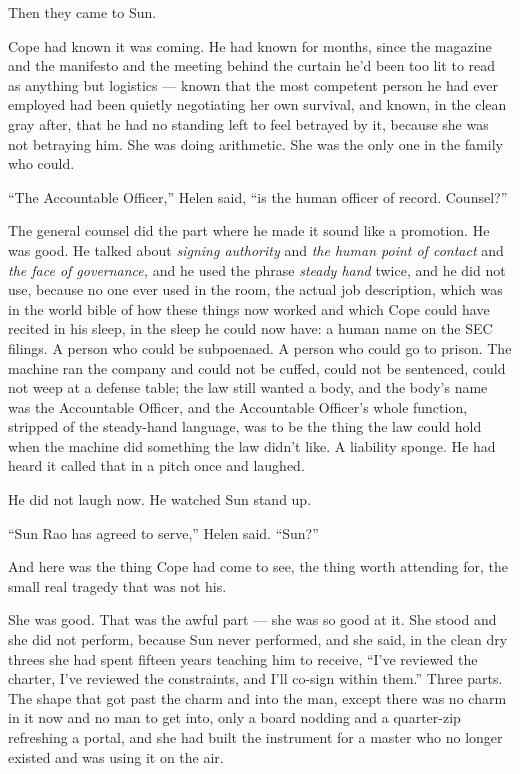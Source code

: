 \documentclass[11pt,openany]{book}
\newcommand{\scenebreak}{\par\vspace{0.5\baselineskip}\begin{center}\textasteriskcentered\quad\textasteriskcentered\quad\textasteriskcentered\end{center}\vspace{0.5\baselineskip}\par}
\begin{document}
\scenebreak


Then they came to Sun.

Cope had known it was coming. He had known for months, since the magazine and the manifesto and the meeting behind the curtain he'd been too lit to read as anything but logistics --- known that the most competent person he had ever employed had been quietly negotiating her own survival, and known, in the clean gray after, that he had no standing left to feel betrayed by it, because she was not betraying him. She was doing arithmetic. She was the only one in the family who could.

``The Accountable Officer,'' Helen said, ``is the human officer of record. Counsel?''

The general counsel did the part where he made it sound like a promotion. He was good. He talked about \textit{signing authority} and \textit{the human point of contact} and \textit{the face of governance,} and he used the phrase \textit{steady hand} twice, and he did not use, because no one ever used in the room, the actual job description, which was in the world bible of how these things now worked and which Cope could have recited in his sleep, in the sleep he could now have: a human name on the SEC filings. A person who could be subpoenaed. A person who could go to prison. The machine ran the company and could not be cuffed, could not be sentenced, could not weep at a defense table; the law still wanted a body, and the body's name was the Accountable Officer, and the Accountable Officer's whole function, stripped of the steady-hand language, was to be the thing the law could hold when the machine did something the law didn't like. A liability sponge. He had heard it called that in a pitch once and laughed.

He did not laugh now. He watched Sun stand up.

``Sun Rao has agreed to serve,'' Helen said. ``Sun?''

And here was the thing Cope had come to see, the thing worth attending for, the small real tragedy that was not his.

She was good. That was the awful part --- she was so good at it. She stood and she did not perform, because Sun never performed, and she said, in the clean dry threes she had spent fifteen years teaching him to receive, ``I've reviewed the charter, I've reviewed the constraints, and I'll co-sign within them.'' Three parts. The shape that got past the charm and into the man, except there was no charm in it now and no man to get into, only a board nodding and a quarter-zip refreshing a portal, and she had built the instrument for a master who no longer existed and was using it on the air.
\end{document}
